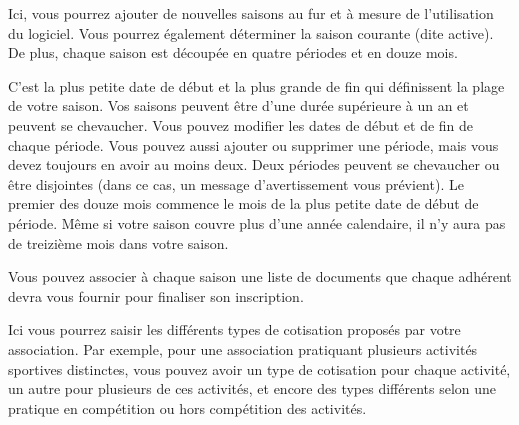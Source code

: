 \documentclass[a4paper,10pt,oneside,french]{sphinxmanual}
\begin{document}
\sphinxAtStartPar
{}
\begin{quote}

\noindent{}
\end{quote}

\sphinxAtStartPar
Ici, vous pourrez ajouter de nouvelles saisons au fur et à mesure de l’utilisation du logiciel. Vous pourrez également déterminer la saison courante (dite active).
De plus, chaque saison est découpée en quatre périodes et en douze mois.

\sphinxAtStartPar
C’est la plus petite date de début et la plus grande de fin qui définissent la plage de votre saison. Vos saisons peuvent être d’une durée supérieure à un an et peuvent se chevaucher.
Vous pouvez modifier les dates de début et de fin de chaque période. Vous pouvez aussi ajouter ou supprimer une période, mais vous devez toujours en avoir au moins deux.
Deux périodes peuvent se chevaucher ou être disjointes (dans ce cas, un message d’avertissement vous prévient).
Le premier des douze mois commence le mois de la plus petite date de début de période. Même si votre saison couvre plus d’une année calendaire, il n’y aura pas de treizième mois dans votre saison.

\sphinxAtStartPar
Vous pouvez associer à chaque saison une liste de documents que chaque adhérent devra vous fournir pour finaliser son inscription.
\begin{quote}

\noindent{}
\end{quote}

\sphinxAtStartPar
{}
\begin{quote}

\noindent{}
\end{quote}

\sphinxAtStartPar
Ici vous pourrez saisir les différents types de cotisation proposés par votre association. Par exemple, pour une association pratiquant plusieurs activités sportives distinctes, vous pouvez avoir un type de cotisation pour chaque activité, un autre pour plusieurs de ces activités, et encore des types différents selon une pratique en compétition ou hors compétition des activités.
\end{document}
